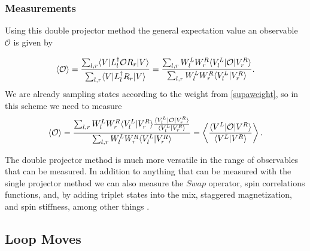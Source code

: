 \subsubsection{Measurements}
Using this double projector method the general expectation value an observable $\mathcal{O}$ is given by

\begin{equation}
\label{generalop1}
\langle \mathcal{O} \rangle = \frac{ \sum_{l,r} \langle {V} \rvert L_l^\dagger \mathcal{O} R_r \lvert {V} \rangle}
							{\sum_{l,r} \langle {V} \rvert L_l^\dagger R_r \lvert {V} \rangle}
		=\frac{ \sum_{l,r} W^L_l W^R_r \langle {V^L_l} \rvert\mathcal{O}  \lvert {V^R_r} \rangle}
							{\sum_{l,r} W^L_l W_r^R \langle {V^L_l} \rvert V^R_r\rangle}.
\end{equation}
We are already sampling states according to the weight from \eqref{supaweight}, so in this scheme we need to measure
\begin{equation}
\label{generalop2}
\langle \mathcal{O} \rangle = 
 \frac{   \sum_{l,r} W^L_l W^R_r  \langle {V^L_l} \rvert V^R_r\rangle    
		\frac{   \langle {V^L_l} \rvert\mathcal{O}  \lvert {V^R_r} \rangle  }{   \langle {V^L_l} \rvert V^R_r\rangle  }}
							{\sum_{l,r} W^L_l W_r^R \langle {V^L_l} \rvert V^R_r\rangle}
	= \left<
		\frac{   \langle {V^L} \rvert\mathcal{O}  \lvert {V^R} \rangle  }{   \langle {V^L} \rvert V^R\rangle  }
						\right>.
\end{equation}

The double projector method is much more versatile in the range of observables that can be measured.  
In addition to anything that can be measured with the single projector method we can also measure the $Swap$ operator, spin correlations functions, and, by adding triplet states into the mix, staggered magnetization, and spin stiffness, among other things \cite{Beach2006}.

\subsection{Loop Moves}
\\

